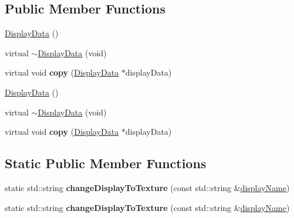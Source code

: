 \subsection*{Public Member Functions}
\begin{DoxyCompactItemize}
\item 
\hyperlink{classcocostudio_1_1DisplayData_ab126e08794f485181ead1f8cf40f5a7d}{Display\+Data} ()
\item 
virtual \hyperlink{classcocostudio_1_1DisplayData_ad5ac2420f0ca264f9a341b7c682dca93}{$\sim$\+Display\+Data} (void)
\item 
\mbox{\label{classcocostudio_1_1DisplayData_af20aeab1647b38f36c6798684fbba098}} 
virtual void {\bfseries copy} (\hyperlink{classcocostudio_1_1DisplayData}{Display\+Data} $\ast$display\+Data)
\item 
\hyperlink{classcocostudio_1_1DisplayData_ab126e08794f485181ead1f8cf40f5a7d}{Display\+Data} ()
\item 
virtual \hyperlink{classcocostudio_1_1DisplayData_ad5ac2420f0ca264f9a341b7c682dca93}{$\sim$\+Display\+Data} (void)
\item 
\mbox{\label{classcocostudio_1_1DisplayData_a28a090c77bb01b201c61253e6763cfd2}} 
virtual void {\bfseries copy} (\hyperlink{classcocostudio_1_1DisplayData}{Display\+Data} $\ast$display\+Data)
\end{DoxyCompactItemize}
\subsection*{Static Public Member Functions}
\begin{DoxyCompactItemize}
\item 
\mbox{\label{classcocostudio_1_1DisplayData_a228e4eca055b1748471f184fc2939e37}} 
static std\+::string {\bfseries change\+Display\+To\+Texture} (const std\+::string \&\hyperlink{classcocostudio_1_1DisplayData_a695d11e0f04eb3e2b2278c67df4c4763}{display\+Name})
\item 
\mbox{\label{classcocostudio_1_1DisplayData_ae90a50073f77fb68d436b6f8e1a93271}} 
static std\+::string {\bfseries change\+Display\+To\+Texture} (const std\+::string \&\hyperlink{classcocostudio_1_1DisplayData_a695d11e0f04eb3e2b2278c67df4c4763}{display\+Name})
\end{DoxyCompactItemize}
